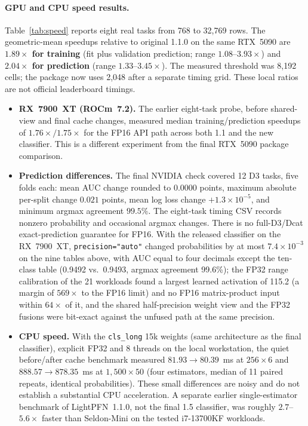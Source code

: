 \documentclass[11pt]{article}
\begin{document}
\paragraph{GPU and CPU speed results.}
Table~\ref{tab:speed} reports eight real tasks from 768 to 32,769 rows. The geometric-mean speedups relative to original 1.1.0 on the same RTX~5090 are \textbf{$1.89\times$ for training} (fit plus validation prediction; range $1.08$--$3.93\times$) and \textbf{$2.04\times$ for prediction} (range $1.33$--$3.45\times$). The measured threshold was 8,192 cells; the package now uses 2,048 after a separate timing grid. These local ratios are not official leaderboard timings. %
\begin{itemize}
\item \textbf{RX~7900~XT (ROCm~7.2).} The earlier eight-task probe, before shared-view and final cache changes, measured median training/prediction speedups of $1.76\times/1.75\times$ for the FP16 API path across both 1.1 and the new classifier. This is a different experiment from the final RTX~5090 package comparison. %
\item \textbf{Prediction differences.} The final NVIDIA check covered 12 D3 tasks, five folds each: mean AUC change rounded to $0.0000$ points, maximum absolute per-split change $0.021$ points, mean log loss change $+1.3\times10^{-5}$, and minimum argmax agreement $99.5\%$. The eight-task timing CSV records nonzero probability and occasional argmax changes. There is no full-D3/Dcat exact-prediction guarantee for FP16. With the released classifier on the RX~7900~XT, \texttt{precision="auto"} changed probabilities by at most $7.4\times10^{-3}$ on the nine tables above, with AUC equal to four decimals except the ten-class table (0.9492 vs.\ 0.9493, argmax agreement 99.6\%); the FP32 range calibration of the 21 workloads found a largest learned activation of 115.2 (a margin of $569\times$ to the FP16 limit) and no FP16 matrix-product input within $64\times$ of it, and the shared half-precision weight view and the FP32 fusions were bit-exact against the unfused path at the same precision. %
\item \textbf{CPU speed.} With the \texttt{cls\_long} 15k weights (same architecture as the final classifier), explicit FP32 and 8 threads on the local workstation, the quiet before/after cache benchmark measured $81.93\to80.39$~ms at $256\times6$ and $888.57\to878.35$~ms at $1{,}500\times50$ (four estimators, median of 11 paired repeats, identical probabilities). These small differences are noisy and do not establish a substantial CPU acceleration. A separate earlier single-estimator benchmark of LightPFN~1.1.0, not the final 1.5 classifier, was roughly $2.7$--$5.6\times$ faster than Seldon-Mini on the tested i7-13700KF workloads. %

\end{itemize}
\end{document}
